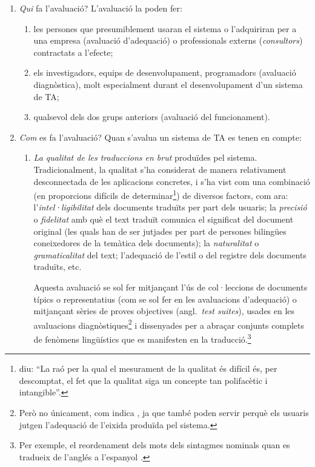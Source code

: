 \begin{enumerate}
\item \emph{Qui} fa l'avaluació? L'avaluació la poden fer:
  \begin{enumerate} 
  \item les persones que presumiblement usaran el sistema o
    l'adquiriran per a una empresa (avaluació d'adequació) o
    professionals externs (\emph{consultors}) contractats a l'efecte;
  \item els investigadors, equips de desenvolupament, programadors
    (avaluació diagnòstica), molt especialment durant el
    desenvolupament d'un sistema de TA;
  \item qualsevol dels dos grups anteriors (avaluació del funcionament).
  \end{enumerate}
\item \emph{Com} es fa l'avaluació? Quan s'avalua un sistema de
  TA es tenen en compte:
\begin{enumerate}
\item \emph{La qualitat de les traduccions en brut} produïdes pel
  sistema. Tradicionalment, la qualitat s'ha considerat de manera
  relativament desconnectada de les aplicacions concretes, i s'ha vist
  com una combinació (en proporcions difícils de
  determinar\footnote{\citet{minnis94j} diu: ``La raó per la qual el
    mesurament de la qualitat és difícil és, per descomptat, el fet
    que la qualitat siga un concepte tan polifacètic i intangible''.})
  de diversos factors, com ara: l'\emph{intel·ligibilitat} dels
  documents traduïts per part dels usuaris; la \emph{precisió} o
  \emph{fidelitat} amb què el text traduït comunica el significat del
  document original (les quals han de ser jutjades per part de
  persones bilingües coneixedores de la temàtica dels documents); la
  \emph{naturalitat} o \emph{gramaticalitat} del text; l'adequació de
  l'estil o del registre dels documents traduïts, etc.

  Aquesta avaluació se sol fer mitjançant l'ús de col·leccions de
  documents típics o representatius (com se sol fer en les avaluacions
  d'adequació) o mitjançant sèries de proves objectives (angl.\
  \emph{test suites}), usades en les avaluacions
  diagnòstiques\footnote{Però no únicament, com indica
    \citet{lewis97j}, ja que també poden servir perquè els usuaris
    jutgen l'adequació de l'eixida produïda pel sistema.} i
  dissenyades per a abraçar conjunts complets de fenòmens lingüístics
  que es manifesten en la traducció.\footnote{Per exemple, el
    reordenament dels mots dels sintagmes nominals quan es tradueix de
    l'anglés a l'espanyol \citep{mira98j,forcada00p}.}


\end{enumerate}
\end{enumerate}

